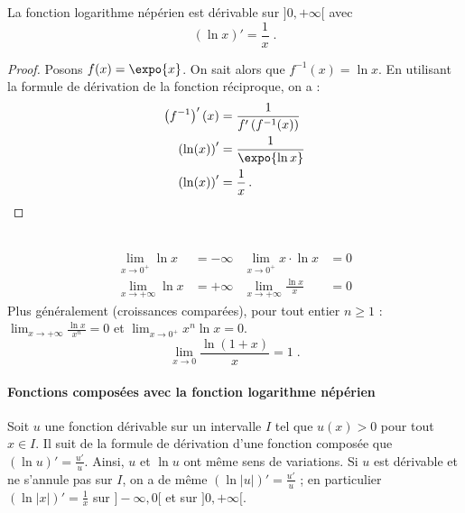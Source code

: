       \begin{thm}
            La fonction logarithme n\'ep\'erien est d\'erivable sur $]0,+\infty[$ avec
                  \begin{equation*}
                        \left( \ln x \right)' = \frac{1}{x}      \;.
                  \end{equation*}
            \begin{proof}
                  Posons $f(x) = \expo{x}$. On sait alors que $f^{-1} (x) = \ln x$.
                  En utilisant la formule de d\'erivation de la fonction r\'eciproque, on a :
                        \begin{align*}
                              \left(f^{-1}\right)' (x)  & = \frac{1}{f' \left( f^{-1} (x) \right) }      \\
                              \left(\ln (x) \right)'    & = \frac{1}{\expo{\ln x}}                       \\
                              \left(\ln (x) \right)'    & = \frac{1}{x}                                  \,.
                        \end{align*}
            \end{proof}
      \end{thm}
      \begin{thm}~\\
                  \begin{align*}
                        \lim_{x\rightarrow 0^+} \ln x                & = -\infty            &
                        \lim_{x\rightarrow 0^+} x\cdot\ln x          & = 0                  \\
                        \lim_{x\rightarrow +\infty} \ln x            & = +\infty            &
                        \lim_{x\rightarrow +\infty} \frac{\ln x}{x}  & = 0                  
                  \end{align*}
                  Plus g\'en\'eralement (croissances compar\'ees), pour tout entier $n \geq 1$ :
                  $\displaystyle \lim_{x\rightarrow +\infty} \frac{\ln x}{x^n} = 0$ et $\displaystyle \lim_{x\rightarrow 0^+} x^n \ln x = 0$.
                  \[
                        \lim_{x\rightarrow 0} \frac{\ln (1 + x)}{x} = 1      \;.
                  \]
      \end{thm}
      \paragraph{Fonctions compos\'ees avec la fonction logarithme n\'ep\'erien}
            Soit $u$ une fonction d\'erivable sur un intervalle $I$ tel que $u(x)>0$ pour tout $x\in I$.
            Il suit de la formule de d\'erivation d'une fonction compos\'ee que 
            $\left( \ln {u} \right)' = \frac{u'}{u}$.
            Ainsi, $u$ et $\ln{u}$ ont m\^eme sens de variations.
            Si $u$ est d\'erivable et ne s'annule pas sur $I$, on a de m\^eme
            $\left( \ln |u| \right)' = \frac{u'}{u}$ ; en particulier $\left(\ln|x|\right)' = \frac{1}{x}$ sur $]-\infty,0[$ et sur $]0,+\infty[$.
            
